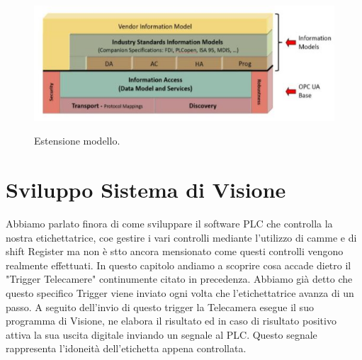 \documentclass[12pt, a4paper, oneside]{book}
\begin{document}
\begin{itemize}
	\begin{figure}[H]
		\centering
		\includegraphics[width=13cm]{Immagini/OPC2}
		\label{OPC2}
		\caption{Estensione modello.}
	\end{figure}
\end{itemize}

\chapter{Sviluppo Sistema di Visione}
Abbiamo parlato finora di come sviluppare il software PLC che controlla la nostra etichettatrice, coe gestire i vari controlli mediante l'utilizzo di camme e di shift Register ma non è stto ancora mensionato come questi controlli vengono realmente effettuati. In questo capitolo andiamo a scoprire cosa accade dietro il "Trigger Telecamere" continumente citato in precedenza.
Abbiamo già detto che questo specifico Trigger viene inviato ogni volta che  l'etichettatrice avanza di un passo. A seguito dell'invio di questo trigger la Telecamera esegue il suo programma di Visione, ne elabora il risultato ed in caso di risultato positivo attiva la sua uscita digitale inviando un segnale al PLC. Questo segnale rappresenta l'idoneità dell'etichetta appena controllata.
\end{document}
